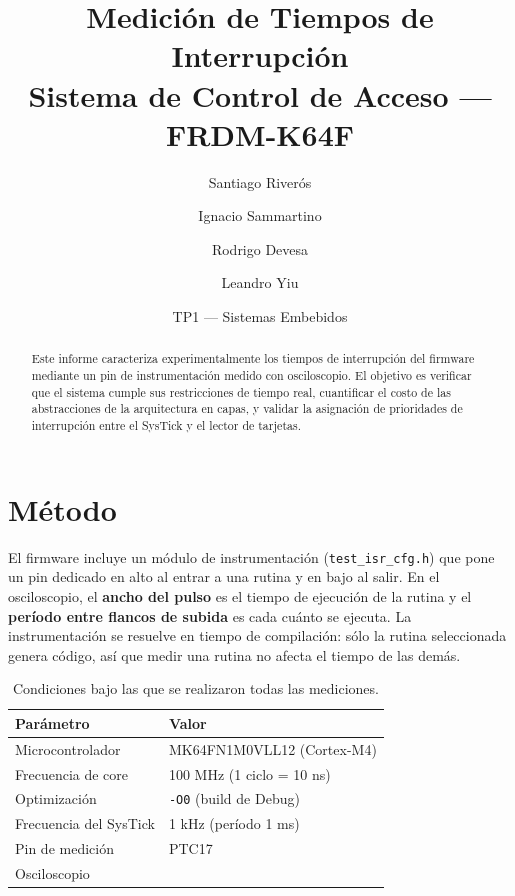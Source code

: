 \documentclass[11pt,a4paper]{article}
\title{\textbf{Medición de Tiempos de Interrupción}\\[4pt]
\large Sistema de Control de Acceso --- FRDM-K64F}
\author{Santiago Riverós \and Ignacio Sammartino \and Rodrigo Devesa \and Leandro Yiu}
\date{TP1 --- Sistemas Embebidos}
\newcommand{\dato}[1][2cm]{\underline{\hspace{#1}}}
\begin{document}
\maketitle

\begin{abstract}
\noindent
Este informe caracteriza experimentalmente los tiempos de interrupción del
firmware mediante un pin de instrumentación medido con osciloscopio. El
objetivo es verificar que el sistema cumple sus restricciones de tiempo
real, cuantificar el costo de las abstracciones de la arquitectura en capas,
y validar la asignación de prioridades de interrupción entre el SysTick y
el lector de tarjetas.
\end{abstract}

\tableofcontents
\newpage

\section{Método}

El firmware incluye un módulo de instrumentación (\texttt{test\_isr\_cfg.h})
que pone un pin dedicado en alto al entrar a una rutina y en bajo al salir.
En el osciloscopio, el \textbf{ancho del pulso} es el tiempo de ejecución de
la rutina y el \textbf{período entre flancos de subida} es cada cuánto se
ejecuta. La instrumentación se resuelve en tiempo de compilación: sólo la
rutina seleccionada genera código, así que medir una rutina no afecta el
tiempo de las demás.

\begin{table}[H]
\centering
\begin{tabular}{@{}ll@{}}
\toprule
\textbf{Parámetro} & \textbf{Valor} \\
\midrule
Microcontrolador        & MK64FN1M0VLL12 (Cortex-M4) \\
Frecuencia de core      & 100 MHz (1 ciclo = 10 ns) \\
Optimización            & \texttt{-O0} (build de Debug) \\
Frecuencia del SysTick  & 1 kHz (período 1 ms) \\
Pin de medición         & PTC17 \\
Osciloscopio            & \dato[4cm] \\
\bottomrule
\end{tabular}
\caption{Condiciones bajo las que se realizaron todas las mediciones.}
\label{tab:condiciones}
\end{table}
\end{document}
